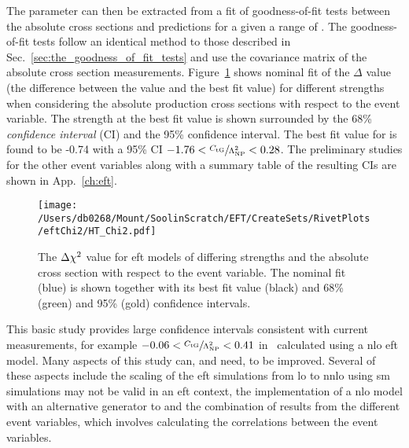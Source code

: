 The \CTG{} parameter can then be extracted from a fit of \chisq{} goodness-of-fit tests between the absolute cross sections and predictions for a given a range of \CTG{}.
The goodness-of-fit tests follow an identical method to those described in Sec.~\ref{sec:the_goodness_of_fit_tests} and use the covariance matrix of the absolute cross section measurements.
Figure~\ref{fig:eftHT} shows nominal fit of the $\Delta$ \chisq{} value (the difference between the \chisq{} value and the best fit \chisq{} value) for different \CTG{} strengths when considering the absolute \ttbar{} production cross sections with respect to the \HT{} event variable.
The \CTG{} strength at the best fit \chisq{} value is shown surrounded by the 68\% \textit{confidence interval} (CI) and the 95\% confidence interval.
The best fit value for \CTG{} is found to be -0.74 with a 95\% CI $-1.76 < \sfrac{C_{\mathrm{tG}}}{\Lambda_{\mathrm{NP}}^{2}} < 0.28$.
The preliminary studies for the other event variables along with a summary table of the resulting CIs are shown in App.~\ref{ch:eft}.
\begin{figure}[htpb]
	\centering
	\texttt{[image: /Users/db0268/Mount/SoolinScratch/EFT/CreateSets/RivetPlots/eftChi2/HT\_Chi2.pdf]}
	\caption[The $\Delta \chisq{}$ value for \acrshort{eft} models of differing \CTG{} strengths and the absolute \ttbar{} cross section with respect to the \HT{} event variable. The nominal fit (blue) is shown together with its best fit value (black) and 68\% (green) and 95\% (gold) confidence intervals.]{The $\Delta \chisq{}$ value for \acrshort{eft} models of differing \CTG{} strengths and the absolute \ttbar{} cross section with respect to the \HT{} event variable. The nominal fit (blue) is shown together with its best fit value (black) and 68\% (green) and 95\% (gold) confidence intervals.}
	\label{fig:eftHT}
\end{figure}

This basic study provides large confidence intervals consistent with current measurements, for example $-0.06 < \sfrac{C_{\mathrm{tG}}}{\Lambda_{\mathrm{NP}}^{2}} < 0.41$ in~\cite{Future:TOP17014} calculated using a \acrshort{nlo} \acrshort{eft} model.
Many aspects of this study can, and need, to be improved.
Several of these aspects include the scaling of the \acrshort{eft} simulations from \acrshort{lo} to \acrshort{nnlo} using \acrshort{sm} simulations may not be valid in an \acrshort{eft} context, the implementation of a \acrshort{nlo} model with an alternative generator to \mgamcMLMpythia{} and the combination of results from the different event variables, which involves calculating the correlations between the event variables.  

